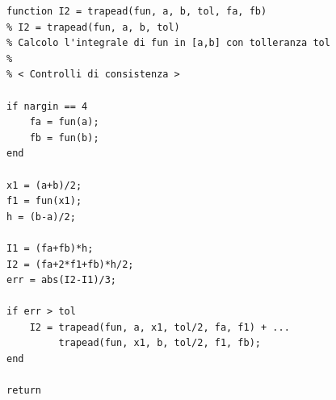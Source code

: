 \begin{verbatim}
function I2 = trapead(fun, a, b, tol, fa, fb)
% I2 = trapead(fun, a, b, tol)
% Calcolo l'integrale di fun in [a,b] con tolleranza tol
%
% < Controlli di consistenza >

if nargin == 4
    fa = fun(a);
    fb = fun(b);
end

x1 = (a+b)/2;
f1 = fun(x1);
h = (b-a)/2;

I1 = (fa+fb)*h;
I2 = (fa+2*f1+fb)*h/2;
err = abs(I2-I1)/3;

if err > tol
    I2 = trapead(fun, a, x1, tol/2, fa, f1) + ...
         trapead(fun, x1, b, tol/2, f1, fb);
end

return
\end{verbatim}